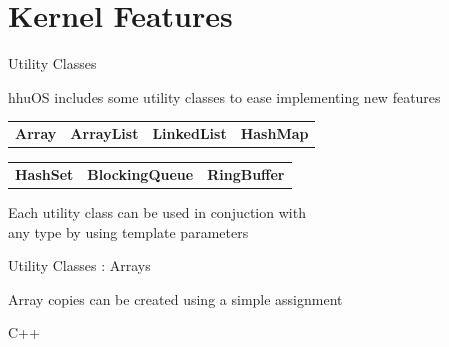 \section{Kernel Features}

\begin{frame}{Utility Classes}

\begin{center}
	hhuOS includes some utility classes to ease implementing new features
\end{center}

\vspace{8pt}

\begin{center}
	\begin{tabular}{c c c c}
		\textbf{Array} & \textbf{ArrayList} & \textbf{LinkedList} & \textbf{HashMap}
	\end{tabular}

	\vspace{8pt}
	
	\begin{tabular}{c c c}
		\textbf{HashSet} & \textbf{BlockingQueue} & \textbf{RingBuffer}
	\end{tabular}
\end{center}

\vspace{8pt}

\begin{center}
	Each utility class can be used in conjuction with \\any type by using template parameters
\end{center}

\end{frame}

\begin{frame}{Utility Classes : Arrays}

\begin{center}
	Array copies can be created using a simple assignment
\end{center}

\begin{center}
	\begin{minipage}{0.55\textwidth}
		\begin{codeblock}{C++}
		\end{codeblock}
	\end{minipage}
	
	\vspace{5pt}
	
	\begin{minipage}{0.22\textwidth}
		\begin{terminalblock}
			\color{termfg}
		\end{terminalblock}
	\end{minipage}
\end{center}

\end{frame}

